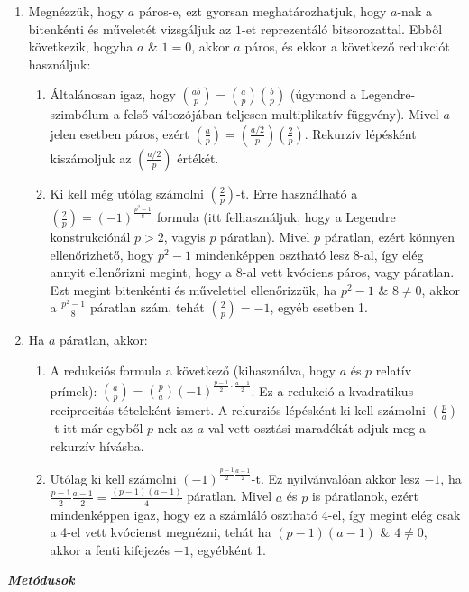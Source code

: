 \documentclass[12pt]{article}
\begin{document}
\begin{enumerate}
	\item Megnézzük, hogy $a$ páros-e, ezt gyorsan meghatározhatjuk, hogy $a$-nak a bitenkénti és műveletét vizsgáljuk az $1$-et reprezentáló bitsorozattal. Ebből következik, hogyha $a$ \& $1 = 0$, akkor $a$ páros, és ekkor a következő redukciót használjuk:
	\begin{enumerate}
		\item  Általánosan igaz, hogy $\left({\frac{ab}{p}}\right) = \left({\frac{a}{p}}\right)\left({\frac{b}{p}}\right)$ (úgymond a Legendre-szimbólum a felső változójában teljesen multiplikatív függvény). Mivel $a$ jelen esetben páros, ezért $\left({\frac{a}{p}}\right) = \left({\frac{a/2}{p}}\right)\left({\frac{2}{p}}\right)$. Rekurzív lépésként kiszámoljuk az $\left({\frac{a/2}{p}}\right)$ értékét.
		\item Ki kell még utólag számolni $\left({\frac{2}{p}}\right)$-t. Erre használható a $\left({\frac{2}{p}}\right) = (-1)^{\frac{p^2-1}{8}}$ formula (itt felhasználjuk, hogy a Legendre konstrukciónál $p > 2$, vagyis $p$ páratlan). Mivel $p$ páratlan, ezért könnyen ellenőrizhető, hogy $p^2-1$ mindenképpen osztható lesz 8-al, így elég annyit ellenőrizni megint, hogy a 8-al vett kvóciens páros, vagy páratlan. Ezt megint bitenkénti és művelettel ellenőrizzük, ha $p^2-1$ \& $8 \not= 0$, akkor a $\frac{p^2-1}{8}$ páratlan szám, tehát $\left({\frac{2}{p}}\right) = -1$, egyéb esetben 1.
	\end{enumerate}
	\item Ha $a$ páratlan, akkor:
	\begin{enumerate}
		\item A redukciós formula a következő (kihasználva, hogy $a$ és $p$ relatív prímek): $\left({\frac{a}{p}}\right) = \left({\frac{p}{a}}\right) (-1)^{\frac{p-1}{2}\cdot\frac{a-1}{2}}$. Ez a redukció a kvadratikus reciprocitás tételeként ismert. A rekurziós lépésként ki kell számolni $\left({\frac{p}{a}}\right)$-t itt már egyből $p$-nek az $a$-val vett osztási maradékát adjuk meg a rekurzív hívásba.
		\item Utólag ki kell számolni $(-1)^{\frac{p-1}{2}\frac{a-1}{2}}$-t. Ez nyilvánvalóan akkor lesz $-1$, ha $\frac{p-1}{2}\frac{a-1}{2} = \frac{(p-1)(a-1)}{4}$ páratlan. Mivel $a$ és $p$ is páratlanok, ezért mindenképpen igaz, hogy ez a számláló osztható 4-el, így megint elég csak a 4-el vett kvócienst megnézni, tehát ha $(p-1)(a-1)$ \& $4 \not=0$, akkor a fenti kifejezés $-1$, egyébként 1.
	\end{enumerate}
\end{enumerate}
\textbf{\textit{Metódusok}}
\end{document}
